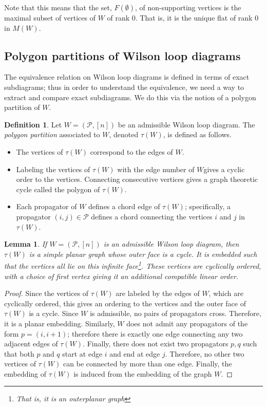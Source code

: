 \documentclass[11pt]{article}
\newcommand{\cP}{\mathcal{P}}
\newtheorem{lem}[thm]{Lemma}
\theoremstyle{remark}
\theoremstyle{definition}
\newtheorem{dfn}[thm]{Definition}
\begin{document}
Note that this means that the set, $F(\emptyset)$, of non-supporting vertices is the maximal subset of vertices of $W$ of rank $0$. That is, it is the unique flat of rank $0$ in $M(W)$. 

\subsection{Polygon partitions of Wilson loop diagrams\label{sec: polygon partitions}}


The equivalence relation on Wilson loop diagrams is defined in terms of exact subdiagrams; thus in order to understand the equivalence, we need a way to extract and compare exact subdiagrams. We do this via the notion of a polygon partition of $W$.

\begin{dfn}
  Let $W = (\cP, [n])$ be an admissible Wilson loop diagram.  The \emph{polygon partition} associated to $W$, denoted $\tau(W)$, is defined as follows.
  \begin{itemize}
  \item The vertices of $\tau(W)$ correspond to the edges of $W$.
  \item Labeling the vertices of $\tau(W)$ with the edge number of $W$gives a cyclic order to the vertices. Connecting consecutive vertices gives a graph theoretic cycle called the polygon of $\tau(W)$.
  \item Each propagator of $W$ defines a chord edge of $\tau(W)$; specifically,  a propagator $(i,j) \in \cP$ defines a chord connecting the vertices $i$ and $j$ in $\tau(W)$.
  \end{itemize}
\end{dfn}

\begin{lem}\label{tausimpleplanarlem}
If $W = (\cP, [n])$ is an admissible Wilson loop diagram, then $\tau(W)$ is a simple planar graph whose outer face is a cycle. It is embedded such that the vertices all lie on this infinite face\footnote{That is, it is an \emph{outerplanar} graph}. These vertices are cyclically ordered, with a choice of first vertex giving it an additional compatible linear order.
\end{lem}

\begin{proof}
Since the vertices of $\tau(W)$ are labeled by the edges of $W$, which are cyclically ordered, this gives an ordering to the vertices and the outer face of $\tau(W)$ is a cycle. Since $W$ is admissible, no pairs of propagators cross. Therefore, it is a planar embedding. Similarly, $W$ does not admit any propagators of the form $p = (i, i+1)$; therefore there is exactly one edge connecting any two adjacent edges of $\tau(W)$. Finally, there does not exist two propagators $p,q$ such that both $p$ and $q$ start at edge $i$ and end at edge $j$. Therefore, no other two vertices of $\tau(W)$ can be connected by more than one edge. Finally, the embedding of $\tau(W)$ is induced from the embedding of the graph $W$.
 \end{proof}
\end{document}
